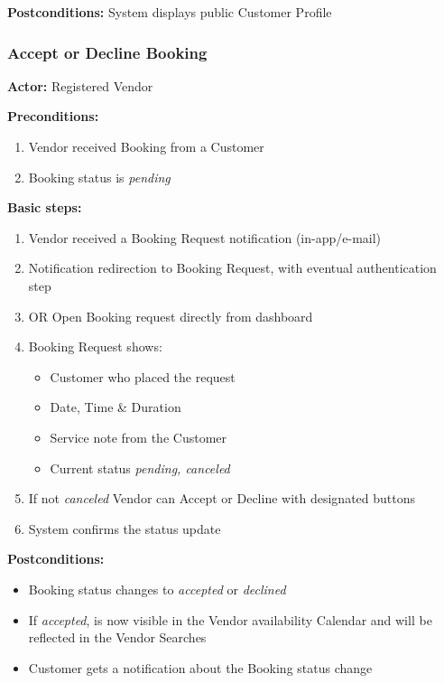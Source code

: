 \documentclass[11pt,a4paper]{article}
\begin{document}
\noindent \textbf{Postconditions:} System displays public Customer Profile

\subsubsection{Accept or Decline Booking}

\textbf{Actor:} Registered Vendor

\noindent \textbf{Preconditions:}
\begin{enumerate}
  \item Vendor received Booking from a Customer
  \item Booking status is \textit{pending}
\end{enumerate}

\noindent \textbf{Basic steps:}
\begin{enumerate}
  \item Vendor received a Booking Request notification (in-app/e-mail)
  \item Notification redirection to Booking Request, with eventual
    authentication step
  \item OR Open Booking request directly from dashboard
  \item Booking Request shows:
    \begin{itemize}
      \item Customer who placed the request
      \item Date, Time \& Duration
      \item Service note from the Customer
      \item Current status \textit{pending, canceled}
    \end{itemize}
  \item If not \textit{canceled} Vendor can Accept or Decline with
    designated buttons
  \item System confirms the status update
\end{enumerate}

\noindent \textbf{Postconditions:}
\begin{itemize}
  \item Booking status changes to \textit{accepted} or \textit{declined}
  \item If \textit{accepted}, is now visible in the Vendor
    availability Calendar and will be reflected in the Vendor Searches
  \item Customer gets a notification about the Booking status change
\end{itemize}
\end{document}
